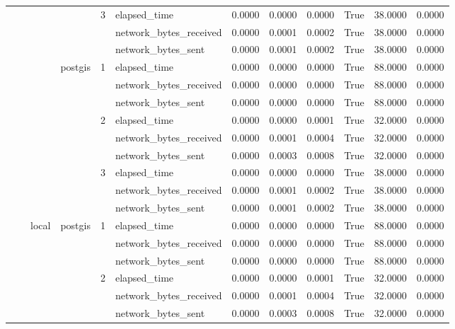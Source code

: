 \begin{tabular}{llllllrrrrrr}
 &  &  &  & \multirow[t]{3}{*}{3} & elapsed_time & 0.0000 & 0.0000 & 0.0000 & True & 38.0000 & 0.0000 \\
 &  &  &  &  & network_bytes_received & 0.0000 & 0.0001 & 0.0002 & True & 38.0000 & 0.0000 \\
 &  &  &  &  & network_bytes_sent & 0.0000 & 0.0001 & 0.0002 & True & 38.0000 & 0.0000 \\
\cline{4-12} \cline{5-12}
 &  &  & \multirow[t]{9}{*}{postgis} & \multirow[t]{3}{*}{1} & elapsed_time & 0.0000 & 0.0000 & 0.0000 & True & 88.0000 & 0.0000 \\
 &  &  &  &  & network_bytes_received & 0.0000 & 0.0000 & 0.0000 & True & 88.0000 & 0.0000 \\
 &  &  &  &  & network_bytes_sent & 0.0000 & 0.0000 & 0.0000 & True & 88.0000 & 0.0000 \\
\cline{5-12}
 &  &  &  & \multirow[t]{3}{*}{2} & elapsed_time & 0.0000 & 0.0000 & 0.0001 & True & 32.0000 & 0.0000 \\
 &  &  &  &  & network_bytes_received & 0.0000 & 0.0001 & 0.0004 & True & 32.0000 & 0.0000 \\
 &  &  &  &  & network_bytes_sent & 0.0000 & 0.0003 & 0.0008 & True & 32.0000 & 0.0000 \\
\cline{5-12}
 &  &  &  & \multirow[t]{3}{*}{3} & elapsed_time & 0.0000 & 0.0000 & 0.0000 & True & 38.0000 & 0.0000 \\
 &  &  &  &  & network_bytes_received & 0.0000 & 0.0001 & 0.0002 & True & 38.0000 & 0.0000 \\
 &  &  &  &  & network_bytes_sent & 0.0000 & 0.0001 & 0.0002 & True & 38.0000 & 0.0000 \\
\cline{3-12} \cline{4-12} \cline{5-12}
 &  & \multirow[t]{9}{*}{local} & \multirow[t]{9}{*}{postgis} & \multirow[t]{3}{*}{1} & elapsed_time & 0.0000 & 0.0000 & 0.0000 & True & 88.0000 & 0.0000 \\
 &  &  &  &  & network_bytes_received & 0.0000 & 0.0000 & 0.0000 & True & 88.0000 & 0.0000 \\
 &  &  &  &  & network_bytes_sent & 0.0000 & 0.0000 & 0.0000 & True & 88.0000 & 0.0000 \\
\cline{5-12}
 &  &  &  & \multirow[t]{3}{*}{2} & elapsed_time & 0.0000 & 0.0000 & 0.0001 & True & 32.0000 & 0.0000 \\
 &  &  &  &  & network_bytes_received & 0.0000 & 0.0001 & 0.0004 & True & 32.0000 & 0.0000 \\
 &  &  &  &  & network_bytes_sent & 0.0000 & 0.0003 & 0.0008 & True & 32.0000 & 0.0000 \\

\end{tabular}
